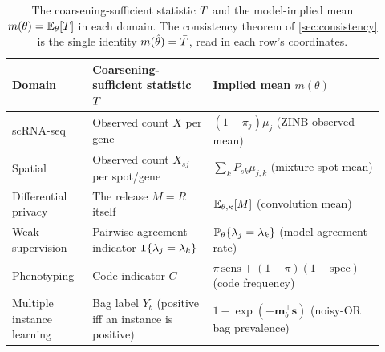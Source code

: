 \begin{table}[tb]
\centering
\small
\begin{tabular}{@{}p{0.20\linewidth} p{0.30\linewidth} p{0.42\linewidth}@{}}
\toprule
\textbf{Domain} & \textbf{Coarsening-sufficient statistic $T$} &
  \textbf{Implied mean $m(\theta)$} \\
\midrule
scRNA-seq \citep{towell2026scrnacoarsening} &
  Observed count $X$ per gene &
  $(1-\pi_j)\mu_j$ (ZINB observed mean) \\
Spatial \citep{towell2026spatialcoarsening} &
  Observed count $X_{sj}$ per spot/gene &
  $\sum_k P_{sk}\mu_{j,k}$ (mixture spot mean) \\
Differential privacy \citep{towell2026dpcoarsening} &
  The release $M = R$ itself &
  $\mathbb{E}_{\theta,\kappa}[M]$ (convolution mean) \\
Weak supervision \citep{towell2026weaksupcoarsening} &
  Pairwise agreement indicator $\mathbf{1}\{\lambda_j = \lambda_k\}$ &
  $\mathbb{P}_\theta\{\lambda_j = \lambda_k\}$ (model agreement rate) \\
Phenotyping \citep{towell2026phenotypecoarsening} &
  Code indicator $C$ &
  $\pi\,\mathrm{sens} + (1-\pi)(1-\mathrm{spec})$ (code frequency) \\
Multiple instance learning \citep{towell2026milcoarsening} &
  Bag label $Y_b$ (positive iff an instance is positive) &
  $1 - \exp(-\bm m_b^\top \bm s)$ (noisy-OR bag prevalence) \\
\bottomrule
\end{tabular}
\caption{The coarsening-sufficient statistic $T$ and the
model-implied mean $m(\theta) = \mathbb{E}_\theta[T]$ in each domain. The
consistency theorem of \cref{sec:consistency} is the single identity
$m(\hat\theta) = \bar{T}$, read in each row's coordinates.}
\label{tab:css}
\end{table}
